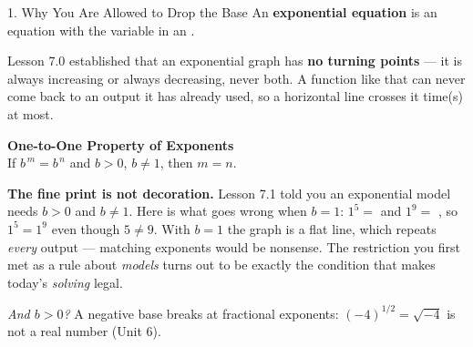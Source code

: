 \documentclass[10pt]{article}
\begin{document}
\begin{notesbox}{1. Why You Are Allowed to Drop the Base}
An \textbf{exponential equation} is an equation with the variable in an \blank{2.6cm}.

\vspace{4pt}
Lesson 7.0 established that an exponential graph has \textbf{no turning points} --- it is always
increasing or always decreasing, never both. A function like that can never come back to an output it
has already used, so a horizontal line crosses it \blank{2.6cm} time(s) at most.

\vspace{4pt}
\begin{center}
\begin{tcolorbox}[colback=goldbg, colframe=goldacc, boxrule=0.8pt, arc=1.5mm, width=0.90\linewidth,
    left=3mm, right=3mm, top=2mm, bottom=2mm]
\centering
\textbf{One-to-One Property of Exponents} \\[3pt]
If \; $b^{\,m} = b^{\,n}$ \; and \; $b>0$, $b\neq1$, \qquad then \; $m=n$.
\end{tcolorbox}
\end{center}

\vspace{2pt}
\textbf{The fine print is not decoration.} Lesson 7.1 told you an exponential model needs $b>0$ and
$b\neq1$. Here is what goes wrong when $b=1$: \; $1^{5}=$ \blank{1.0cm} \; and \; $1^{9}=$
\blank{1.0cm}, \; so $1^{5}=1^{9}$ even though $5\neq9$. With $b=1$ the graph is a flat line, which
repeats \emph{every} output --- matching exponents would be nonsense. The restriction you first met as
a rule about \emph{models} turns out to be exactly the condition that makes today's \emph{solving}
legal.

\vspace{3pt}
\emph{And $b>0$?} A negative base breaks at fractional exponents: $(-4)^{1/2}=\sqrt{-4}$ is not a real
number (Unit 6).
\end{notesbox}
\end{document}
